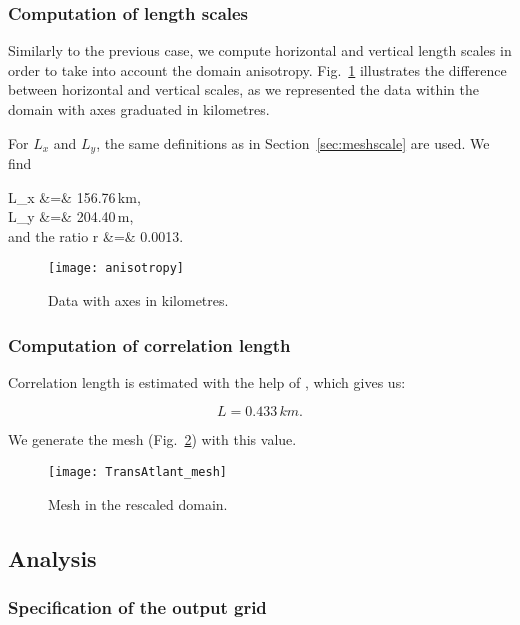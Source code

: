 \subsubsection{Computation of length scales}

Similarly to the previous case, we compute horizontal and vertical length scales in order to take into account the domain anisotropy. Fig.~\ref{fig:anisotropy} illustrates the difference between horizontal and vertical scales, as we represented the data within the domain with axes graduated in kilometres.

For $L_x$ and $L_y$, the same definitions as in Section~\ref{sec:meshscale} are used. We find

\beqn
L_x &=& 156.76\,km, \\
L_y &=& 204.40\,m, \\
\textrm{and the ratio\qquad} r &=&  0.0013.
\eeqn

\begin{figure}[htpb]
\centering
\texttt{[image: anisotropy]}
\caption{Data with axes in kilometres.\label{fig:anisotropy}}
\end{figure}



\subsubsection{Computation of correlation length}

Correlation length is estimated with the help of , which gives us:

\[L=0.433\,km.\]

We generate the mesh (Fig.~\ref{fig:trans_mesh}) with this value.

\begin{figure}[H]
\centering
\texttt{[image: TransAtlant\_mesh]}
\caption{Mesh in the rescaled domain.\label{fig:trans_mesh}}
\end{figure}



\subsection{Analysis}

\subsubsection{Specification of the output grid}

